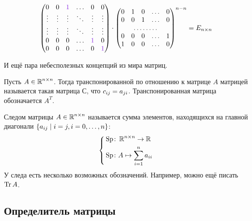 \documentclass[a4paper,12pt]{article}
\begin{document}
\begin{solution}
\begin{equation*}
\begin{split}
\begin{pmatrix}
          0 & 0 & \textcolor{light-purple}{1} & \ldots & 0 & 0\\
          \vdots & \vdots & \vdots & \ddots & \vdots & \vdots\\
          \vdots & \vdots & \vdots & \ddots & \vdots & \vdots\\
          0 & 0 & 0 & \ldots & \textcolor{light-purple}{1} & 0\\
          0 & 0 & 0 & \ldots & 0 & \textcolor{light-purple}{1}
        \end{pmatrix}
        \cdot \begin{pmatrix}
          0 & 1 & 0 & \ldots & 0\\
          0 & 0 & 1 & \ldots & 0\\
          \hdotsfor{5}\\
          0 & 0 & 0 & \ldots & 1\\
          1 & 0 & 0 & \ldots & 0
        \end{pmatrix}^{n-n}
      = E_{n \times n}
    \end{split}
    \end{equation*}
  \end{solution}
  
  И ещё пара небесполезных концепций из мира матриц.
  
  \begin{definition}
    Пусть $A \in \operatorname{\mathbb R}^{n \times n}$.
    Тогда транспонированной по отношению к матрице $A$ матрицей называется такая матрица $С$, что
    $c_{ij} \hm= a_{ji}$.
    Транспонированная матрица обозначается $A^T$.
  \end{definition}
  
  \begin{definition}
    Следом матрицы $A \in \operatorname{\mathbb R}^{n \times n}$ называется сумма элементов, находящихся на главной диагонали $\{a_{ij} \hm\mid i = j, i = 0, \ldots, n\}$:
    \[
      \left\{
        \begin{aligned}
          &\operatorname{Sp} \colon \operatorname{\mathbb R}^{n \times n} \to \operatorname{\mathbb R}\\
          &\operatorname{Sp} \colon A \mapsto \sum_{i = 1}^n a_{ii}
        \end{aligned}
      \right.
    \]
    У следа есть несколько возможных обозначений.
    Например, можно ещё писать $\operatorname{Tr} A$.
  \end{definition}


  \subsection{Определитель матрицы}
  
\end{document}
